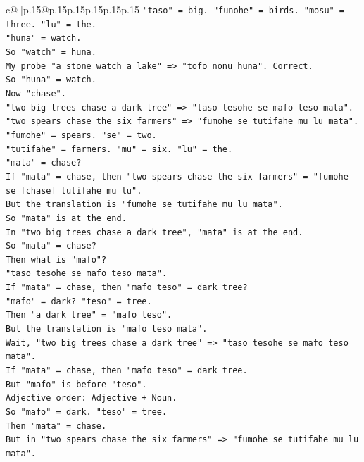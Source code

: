 \documentclass{article}
\begin{document}
{\begin{supertabular}{c@{$\;$}|p{.15\linewidth}@{}p{.15\linewidth}p{.15\linewidth}p{.15\linewidth}p{.15\linewidth}p{.15\linewidth}}
{{{\texttt{"taso" = big. "funohe" = birds. "mosu" = three. "lu" = the.} \\
\texttt{"huna" = watch.} \\
\texttt{So "watch" = huna.} \\
\texttt{My probe "a stone watch a lake" => "tofo nonu huna". Correct.} \\
\texttt{So "huna" = watch.} \\
\texttt{Now "chase".} \\
\texttt{"two big trees chase a dark tree" => "taso tesohe se mafo teso mata".} \\
\texttt{"two spears chase the six farmers" => "fumohe se tutifahe mu lu mata".} \\
\texttt{"fumohe" = spears. "se" = two.} \\
\texttt{"tutifahe" = farmers. "mu" = six. "lu" = the.} \\
\texttt{"mata" = chase?} \\
\texttt{If "mata" = chase, then "two spears chase the six farmers" = "fumohe se {[}chase{]} tutifahe mu lu".} \\
\texttt{But the translation is "fumohe se tutifahe mu lu mata".} \\
\texttt{So "mata" is at the end.} \\
\texttt{In "two big trees chase a dark tree", "mata" is at the end.} \\
\texttt{So "mata" = chase?} \\
\texttt{Then what is "mafo"?} \\
\texttt{"taso tesohe se mafo teso mata".} \\
\texttt{If "mata" = chase, then "mafo teso" = dark tree?} \\
\texttt{"mafo" = dark? "teso" = tree.} \\
\texttt{Then "a dark tree" = "mafo teso".} \\
\texttt{But the translation is "mafo teso mata".} \\
\texttt{Wait, "two big trees chase a dark tree" => "taso tesohe se mafo teso mata".} \\
\texttt{If "mata" = chase, then "mafo teso" = dark tree.} \\
\texttt{But "mafo" is before "teso".} \\
\texttt{Adjective order: Adjective + Noun.} \\
\texttt{So "mafo" = dark. "teso" = tree.} \\
\texttt{Then "mata" = chase.} \\
\texttt{But in "two spears chase the six farmers" => "fumohe se tutifahe mu lu mata".} \\
}}}
\end{supertabular}}
\end{document}
